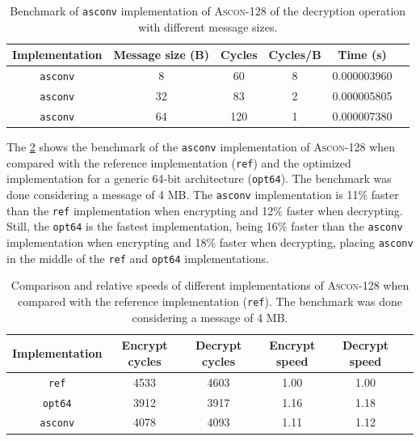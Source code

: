 \documentclass[11pt,twoside]{article}
\begin{document}
\begin{table}
  \centering
  \begin{tabular}{|c|c|c|c|c|c|}
    \hline
    \textbf{Implementation} & \textbf{Message size (B)} &
    \textbf{Cycles}         & \textbf{Cycles/B}         & \textbf{Time (s)}                   \\ \hline

    \texttt{asconv}         & 8                         & 60                & 8 & 0.000003960 \\ \hline

    \texttt{asconv}         & 32                        & 83                & 2 & 0.000005805 \\ \hline

    \texttt{asconv}         & 64                        & 120               & 1 & 0.000007380 \\ \hline
  \end{tabular}
  \caption{Benchmark of \texttt{asconv} implementation of \textsc{Ascon-128} of the decryption operation with different message sizes.}
  \label{table:asconvDecryptionBenchmark}
\end{table}

The \cref{table:relativeBenchmark} shows the benchmark of the \texttt{asconv} implementation of \textsc{Ascon-128} when compared with the reference implementation (\texttt{ref}) and the optimized implementation for a generic 64-bit architecture (\texttt{opt64}). The benchmark was done considering a message of 4 MB. The \texttt{asconv} implementation is 11\% faster than the \texttt{ref} implementation when encrypting and 12\% faster when decrypting. Still, the \texttt{opt64} is the fastest implementation, being 16\% faster than the \texttt{asconv} implementation when encrypting and 18\% faster when decrypting, placing \texttt{asconv} in the middle of the \texttt{ref} and \texttt{opt64} implementations.

\begin{table}[h]
  \centering
  \begin{tabular}{|c|c|c|c|c|c|}
    \hline
    \textbf{Implementation} & \textbf{Encrypt cycles} &
    \textbf{Decrypt cycles} & \textbf{Encrypt speed}  & \textbf{Decrypt speed}               \\ \hline

    \texttt{ref}            & 4533                    & 4603                   & 1.00 & 1.00 \\ \hline

    \texttt{opt64}          & 3912                    & 3917                   & 1.16 & 1.18 \\ \hline

    \texttt{asconv}         & 4078                    & 4093                   & 1.11 & 1.12 \\ \hline
  \end{tabular}
  \caption{Comparison and relative speeds of different implementations of \textsc{Ascon-128} when compared with the reference implementation (\texttt{ref}). The benchmark was done considering a message of 4 MB.}
  \label{table:relativeBenchmark}
\end{table}
\end{document}
